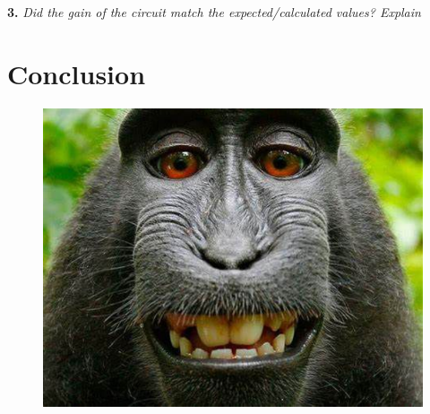 \documentclass[CMPE]{KGCOEReport}
\begin{document}
\textbf{3.} \emph{Did the gain of the circuit match the expected/calculated values? Explain}

\section*{Conclusion}



\newpage
\begin{figure}[H]
    \centering
    \begin{adjustbox}{center}
        \includegraphics[width=1.26\textwidth]{signoff.pdf}
    \end{adjustbox}
\end{figure}
\end{document}
